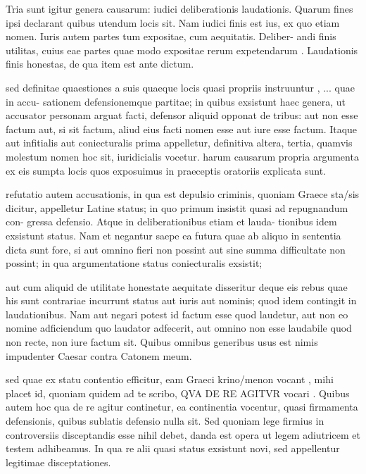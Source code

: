 Tria sunt igitur genera causarum: iudici deliberationis laudationis. Quarum fines ipsi declarant quibus utendum locis sit. Nam iudici finis est ius, ex quo etiam nomen. Iuris autem partes tum expositae, cum aequitatis. Deliber- andi finis utilitas, cuius eae partes quae modo expositae rerum expetendarum . Laudationis finis honestas, de qua item est ante dictum.

 sed definitae quaestiones a suis quaeque locis quasi propriis instruuntur , ... quae in accu- sationem defensionemque partitae; in quibus exsistunt haec genera, ut accusator personam arguat facti, defensor aliquid opponat de tribus: aut non esse factum aut, si sit factum, aliud eius facti nomen esse aut iure esse factum. Itaque aut infitialis aut coniecturalis prima appelletur, definitiva altera, tertia, quamvis molestum nomen hoc sit, iuridicialis vocetur. harum causarum propria argumenta ex eis sumpta locis quos exposuimus in praeceptis oratoriis explicata sunt.

 refutatio autem accusationis, in qua est depulsio criminis, quoniam Graece sta/sis dicitur, appelletur Latine status; in quo primum insistit quasi ad repugnandum con- gressa defensio. Atque in deliberationibus etiam et lauda- tionibus idem exsistunt status. Nam et negantur saepe ea futura quae ab aliquo in sententia dicta sunt fore, si aut omnino fieri non possint aut sine summa difficultate non possint; in qua argumentatione status coniecturalis exsistit;

 aut cum aliquid de utilitate honestate aequitate disseritur deque eis rebus quae his sunt contrariae incurrunt status aut iuris aut nominis; quod idem contingit in laudationibus. Nam aut negari potest id factum esse quod laudetur, aut non eo nomine adficiendum quo laudator adfecerit, aut omnino non esse laudabile quod non recte, non iure factum sit. Quibus omnibus generibus usus est nimis impudenter Caesar contra Catonem meum.

 sed quae ex statu contentio efficitur, eam Graeci krino/menon vocant , mihi placet id, quoniam quidem ad te scribo, QVA DE RE AGITVR vocari . Quibus autem hoc qua de re agitur continetur, ea continentia vocentur, quasi firmamenta defensionis, quibus sublatis defensio nulla sit. Sed quoniam lege firmius in controversiis disceptandis esse nihil debet, danda est opera ut legem adiutricem et testem adhibeamus. In qua re alii quasi status exsistunt novi, sed appellentur legitimae disceptationes.

